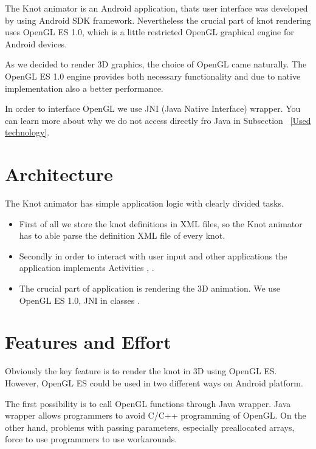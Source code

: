 The Knot animator is an Android application, 
thats user interface was developed by using Android SDK framework.
Nevertheless the crucial part of knot rendering uses OpenGL ES 1.0,
which is a little restricted OpenGL graphical engine for Android devices.

As we decided to render 3D graphics, the choice of OpenGL came naturally.
The OpenGL ES 1.0 engine provides both necessary functionality and due to
native implementation also a better performance.

In order to interface OpenGL we use JNI (Java Native Interface) wrapper.
You can learn more about why we do not access directly fro Java in Subsection ~\ref{Used technology}.


\section*{Architecture} %
\label{sec:Architecture}
The Knot animator has simple application logic with clearly divided tasks.
\begin{itemize}
  \item First of all we store the knot definitions in XML files,
so the Knot animator has to able parse the definition XML file of every knot.
  \item Secondly in order to interact with user input and other applications the application 
  implements Activities , .
  \item The crucial part of application is rendering the 3D animation. We use OpenGL ES 1.0,
      JNI in classes  .
\end{itemize}



\section*{Features and Effort} %
\label{sec:Features and Effort}
Obviously the key feature is to render the knot in 3D using OpenGL ES.
However, OpenGL ES could be used in two different ways on Android platform.

The first possibility is to call OpenGL functions through Java wrapper.
Java wrapper allows programmers to avoid C/C++ programming of OpenGL.
On the other hand, problems with passing parameters, especially preallocated arrays,
force to use programmers to use workarounds.

